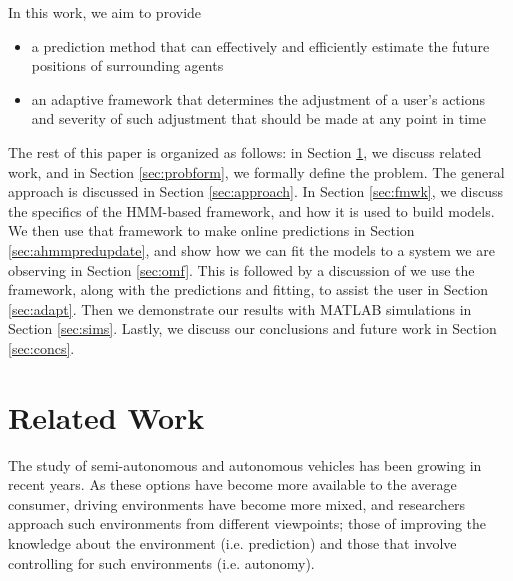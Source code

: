 \documentclass[letterpaper, 10 pt, conference]{ieeeconf}  %
\begin{document}
     In this work, we aim to provide
    \begin{itemize}
    \item{a prediction method that can effectively and efficiently estimate the future positions of surrounding agents}
    \item{an adaptive framework that determines the adjustment of a user's actions and severity of such adjustment that should be made at any point in time}
    \end{itemize}
  
    
    The rest of this paper is organized as follows: in Section \ref{sec:relatedwork}, we discuss related work, and in Section \ref{sec:probform}, we formally define the problem. The general approach is discussed in Section \ref{sec:approach}. In Section \ref{sec:fmwk}, we discuss the specifics of the HMM-based framework, and how it is used to build models. We then use that framework to make online predictions in Section \ref{sec:ahmmpredupdate}, and show how we can fit the models to a system we are observing in Section \ref{sec:omf}. This is followed by a discussion of we use the framework, along with the predictions and fitting, to assist the user in Section \ref{sec:adapt}. Then we demonstrate our results with MATLAB simulations in Section \ref{sec:sims}. Lastly, we discuss our conclusions and future work in Section \ref{sec:concs}.

    

\section{Related Work} \label{sec:relatedwork}

The study of semi-autonomous and autonomous vehicles has been growing in recent years. As these options have become more available to the average consumer, driving environments have become more mixed, and researchers approach such environments from different viewpoints; those of improving the knowledge about the environment (i.e. prediction) and those that involve controlling for such environments (i.e. autonomy).
\end{document}
